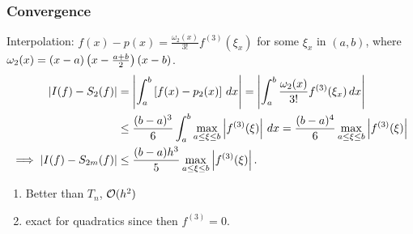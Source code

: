\documentclass[]{article}
\begin{document}
\subsubsection*{Convergence}

Interpolation: $f(x)-p(x) = \frac{\omega_2(x)}{3!} f^{(3)}(\xi_x)$ for some $\xi_x$ in $(a,b)$, where $\omega_2(x) = (x-a)\left(x-\frac{a+b}2\right)(x-b)$.
\begin{align*}
	|I(f)-S_2(f)|
	&= \left|\int_a^b\left[f(x)-p_2(x)\right]\,dx\right|
	= \left|\int_a^b \frac{\omega_2(x)}{3!} f^{(3)}(\xi_x)\,dx\right| \\
	&\leq \frac{(b-a)^3}6\int_a^b \max_{a\leq\xi\leq b} \left|f^{(3)}(\xi)\right|\,dx
	= \frac{(b-a)^4}6 \max_{a\leq\xi\leq b}\left|f^{(3)}(\xi)\right| \\
	\implies |I(f)-S_{2m}(f)|
	&\leq \frac{(b-a)h^3}5 \max_{a\leq\xi\leq b} \left|f^{(3)}(\xi)\right|.
\end{align*}
\begin{enumerate}
	\item Better than $T_n$, $\mathcal{O}(h^2)$
	\item exact for quadratics since then $f^{(3)}=0$.
\end{enumerate}
\end{document}
